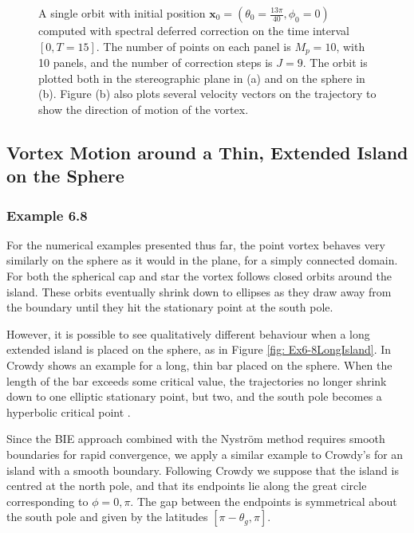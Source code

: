 \documentclass{sfuthesis}
\begin{document}
\begin{figure}[h]
\begin{subfigure}[b]{0.4\textwidth}
  	\caption{} 
     	\end{subfigure}
   	 \caption{A single orbit with initial position  $\mathbf{x}_0=(\theta_0=\frac{13\pi}{40}, \phi_0=0)$ computed with spectral deferred correction on the time interval $[0,T=15]$. The number of points on each panel is $M_p=10$, with 10 panels, and the number of correction steps is $J=9$. The orbit is plotted both in the stereographic plane in (a) and on the sphere in (b). Figure (b) also plots several velocity vectors on the trajectory to show the direction of motion of the vortex. }
     	\label{fig: Ex6-7StarSDC}
 \end{figure}

\clearpage
\subsection{Vortex Motion around a Thin, Extended Island on the Sphere} 
\subsubsection{Example 6.8}
For the numerical examples presented thus far, the point vortex behaves very similarly on the sphere as it would in the plane, for a simply connected domain. For both the spherical cap and star the vortex follows closed orbits around the island. These orbits eventually shrink down to ellipses as they draw away from the boundary until they hit the stationary point at the south pole. 

However, it is possible to see qualitatively different behaviour when a long extended island is placed on the sphere, as in Figure \ref{fig: Ex6-8LongIsland}. In \cite{Crowdy2006} Crowdy shows an example for a long, thin bar placed on the sphere. When the length of the bar exceeds some critical value, the trajectories no longer shrink down to one elliptic stationary point, but two, and the south pole becomes a hyperbolic critical point \cite{Crowdy2006}. 

Since the BIE approach combined with the Nystr\"{o}m method requires smooth boundaries for rapid convergence, we apply a similar example to Crowdy's for an island with a smooth boundary. Following Crowdy \cite{Crowdy2006} we suppose that the island is centred at the north pole, and that its endpoints lie along the great circle corresponding to $\phi=0,\pi$. The gap between the endpoints is symmetrical about the south pole and given by the latitudes $[\pi -\theta_g, \pi]$. 
\end{document}
